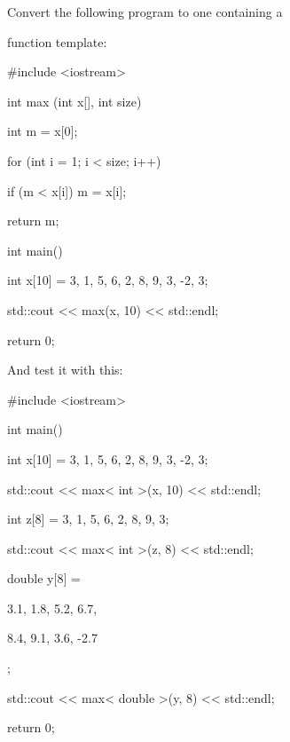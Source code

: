 Convert the following program to one containing a

function template:



\begin{consolethree}[escapeinside=||]

#include <iostream>



int max (int x[], int size)

{

    int m = x[0];

    for (int i = 1; i < size; i++)

    {

        if (m < x[i]) m = x[i];

    }

    return m;

}



int main()

{

    int x[10] = {3, 1, 5, 6, 2, 8, 9, 3, -2, 3};

    std::cout << max(x, 10) << std::endl;

    return 0;

}

\end{consolethree}



And test it with this:



\begin{consolethree}[escapeinside=||]

#include <iostream>



int main() {

    int x[10] = {3, 1, 5, 6, 2, 8, 9, 3, -2, 3};

    std::cout << max< int >(x, 10) << std::endl;



    int z[8] = {3, 1, 5, 6, 2, 8, 9, 3};

    std::cout << max< int >(z, 8) << std::endl;



    double y[8] = {3.1, 1.8, 5.2, 6.7,

                   8.4, 9.1, 3.6, -2.7};

    std::cout << max< double >(y, 8) << std::endl;

    return 0;

}

\end{consolethree}

